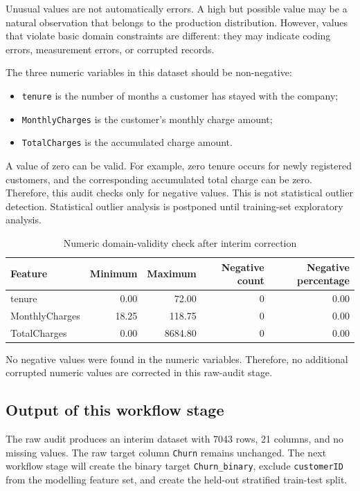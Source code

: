 Unusual values are not automatically errors. A high but possible value may be a natural observation that belongs to the production distribution. However, values that violate basic domain constraints are different: they may indicate coding errors, measurement errors, or corrupted records.

The three numeric variables in this dataset should be non-negative:

\begin{itemize}[leftmargin=*]
    \item \texttt{tenure} is the number of months a customer has stayed with the company;
    \item \texttt{MonthlyCharges} is the customer's monthly charge amount;
    \item \texttt{TotalCharges} is the accumulated charge amount.
\end{itemize}

A value of zero can be valid. For example, zero tenure occurs for newly registered customers, and the corresponding accumulated total charge can be zero. Therefore, this audit checks only for negative values. This is not statistical outlier detection. Statistical outlier analysis is postponed until training-set exploratory analysis.

\begin{table}[H]
\centering
\caption{Numeric domain-validity check after interim correction}
\label{tab:numeric-domain-validity}
\begin{tabular}{lrrrr}
\toprule
Feature & Minimum & Maximum & Negative count & Negative percentage \\
\midrule
tenure & 0.00 & 72.00 & 0 & 0.00 \\
MonthlyCharges & 18.25 & 118.75 & 0 & 0.00 \\
TotalCharges & 0.00 & 8684.80 & 0 & 0.00 \\
\bottomrule
\end{tabular}
\end{table}

No negative values were found in the numeric variables. Therefore, no additional corrupted numeric values are corrected in this raw-audit stage.

\subsection{Output of this workflow stage}

The raw audit produces an interim dataset with 7043 rows, 21 columns, and no missing values. The raw target column \texttt{Churn} remains unchanged. The next workflow stage will create the binary target \texttt{Churn\_binary}, exclude \texttt{customerID} from the modelling feature set, and create the held-out stratified train-test split.

